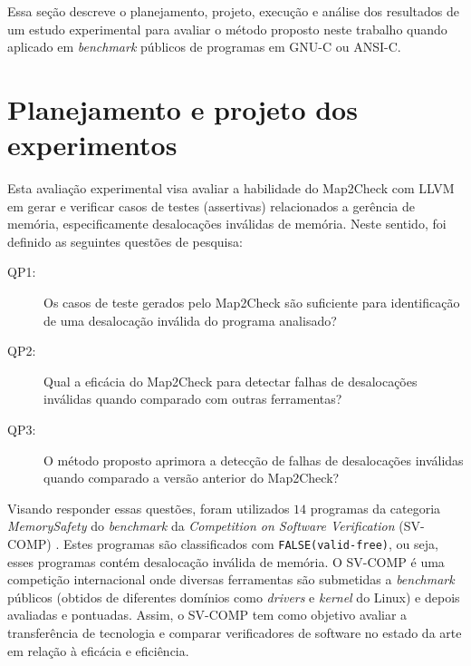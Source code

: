 \label{chapter:resultados}

Essa seção descreve o planejamento, projeto, execução e análise dos resultados de um estudo experimental para avaliar o método proposto neste trabalho quando aplicado 
em \textit{benchmark} públicos de programas em GNU-C ou ANSI-C. 

\section{Planejamento e projeto dos experimentos}
\label{sub:experimento}

Esta avaliação experimental visa avaliar a habilidade do Map2Check com LLVM em gerar e verificar casos de testes (assertivas) relacionados a gerência de memória, especificamente desalocações inválidas de memória. 
Neste sentido, foi definido as seguintes questões de pesquisa:
\begin{description}
\item[QP1:] Os casos de teste gerados pelo Map2Check são suficiente para identificação de uma desalocação inválida do programa analisado?
%
\item[QP2:] Qual a eficácia do Map2Check para detectar falhas de desalocações inválidas quando comparado com outras ferramentas?
%
\item[QP3:] O método proposto aprimora a detecção de falhas de desalocações inválidas quando comparado a versão anterior do Map2Check?
\end{description}

Visando responder essas questões, foram utilizados $14$ programas da categoria 
\textit{MemorySafety} do \textit{benchmark} da \textit{Competition on Software Verification} (SV-COMP) \cite{beyer:2016}. Estes programas são classificados com \texttt{FALSE(valid-free)}, ou seja, esses programas contém desalocação inválida de memória. O SV-COMP é uma competição internacional onde diversas ferramentas são submetidas a \textit{benchmark} públicos (obtidos de diferentes domínios como \textit{drivers} e \textit{kernel} do Linux) e depois avaliadas e pontuadas. Assim, o SV-COMP tem como objetivo avaliar a transferência de tecnologia e comparar verificadores de software no estado da arte em relação à eficácia e eficiência. 

